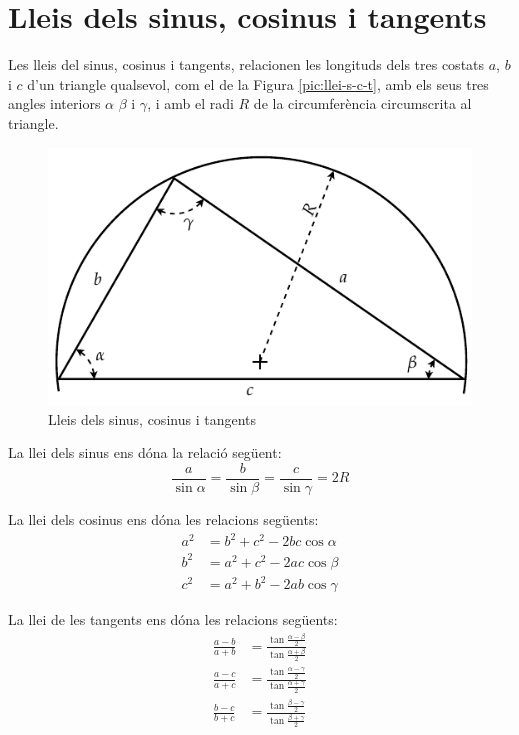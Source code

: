 \section{Lleis dels sinus, cosinus i tangents}\label{sec:llei-s-c-t}

Les lleis del sinus, cosinus i tangents, relacionen les longituds
dels tres costats $a$, $b$ i $c$ d'un triangle qualsevol, com el de
la Figura \vref{pic:llei-s-c-t}, amb els seus tres angles interiors
$\alpha$ $\beta$ i $\gamma$, i amb el radi $R$ de la circumfer\`{e}ncia circumscrita al triangle.

\begin{figure}[htb]
\centering
    \includegraphics{Imatges/Ape-Trigonometria-Triangle.pdf}
\caption{Lleis dels sinus, cosinus i tangents} \label{pic:llei-s-c-t}
\end{figure}

La llei dels sinus ens d\'{o}na la relaci\'{o} seg\"{u}ent:
\begin{equation}
    \frac{a}{\sin\alpha} = \frac{b}{\sin\beta} =
    \frac{c}{\sin\gamma} = 2 R
\end{equation}

La llei dels cosinus ens d\'{o}na les relacions seg\"{u}ents:
\begin{subequations}
\begin{align}
    a^2 &= b^2 + c^2 - 2 b c \cos\alpha \\[1ex]
    b^2 &= a^2 + c^2 - 2 a c \cos\beta \\[1ex]
    c^2 &= a^2 + b^2 - 2 a b \cos\gamma
\end{align}
\end{subequations}

La llei de les tangents ens d\'{o}na les relacions seg\"{u}ents:
\begin{subequations}
\begin{align}
    \frac{a-b}{a+b} &= \frac{\tan\frac{\alpha-\beta}{2}}{\tan\frac{\alpha+\beta}{2}} \\[1ex]
    \frac{a-c}{a+c} &= \frac{\tan\frac{\alpha-\gamma}{2}}{\tan\frac{\alpha+\gamma}{2}} \\[1ex]
    \frac{b-c}{b+c} &= \frac{\tan\frac{\beta-\gamma}{2}}{\tan\frac{\beta+\gamma}{2}}
\end{align}
\end{subequations}

